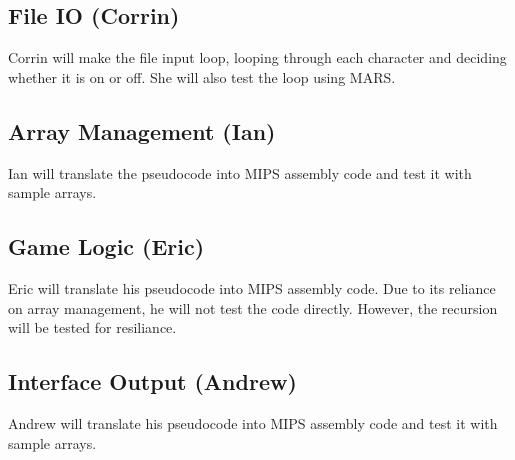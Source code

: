 \documentclass[12pt]{article}
\begin{document}
  \subsection{File IO (Corrin)}
  Corrin will make the file input loop, looping through each character and
  deciding whether it is on or off. She will also test the loop using MARS.
  \subsection{Array Management (Ian)}
  Ian will translate the pseudocode into MIPS assembly code and test it with
  sample arrays.
  \subsection{Game Logic (Eric)}
  Eric will translate his pseudocode into MIPS assembly code. Due to its
  reliance on array management, he will not test the code directly. However,
  the recursion will be tested for resiliance.
  \subsection{Interface Output (Andrew)}
  Andrew will translate his pseudocode into MIPS assembly code and test it with
  sample arrays.
\end{document}
